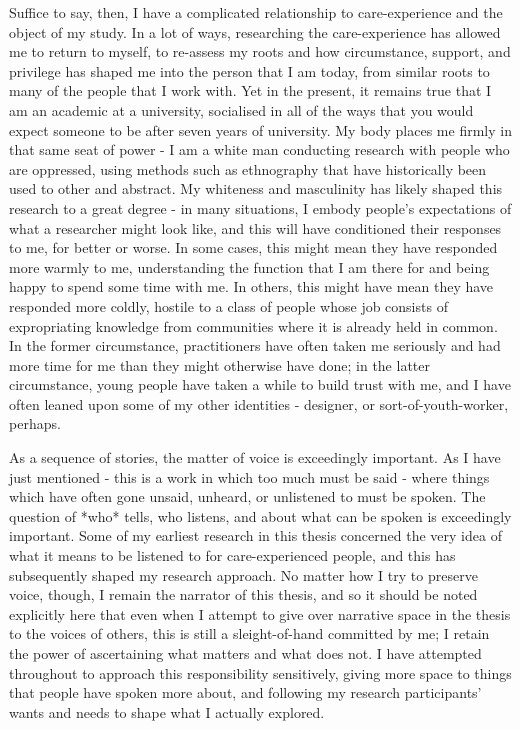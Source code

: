 Suffice to say, then, I have a complicated relationship to care-experience and the object of my study. In a lot of ways, researching the care-experience has allowed me to return to myself, to re-assess my roots and how circumstance, support, and privilege has shaped me into the person that I am today, from similar roots to many of the people that I work with. Yet in the present, it remains true that I am an academic at a university, socialised in all of the ways that you would expect someone to be after seven years of university. My body places me firmly in that same seat of power - I am a white man conducting research with people who are oppressed, using methods such as ethnography that have historically been used to other and abstract. My whiteness and masculinity has likely shaped this research to a great degree - in many situations, I embody people’s expectations of what a researcher might look like, and this will have conditioned their responses to me, for better or worse. In some cases, this might mean they have responded more warmly to me, understanding the function that I am there for and being happy to spend some time with me. In others, this might have mean they have responded more coldly, hostile to a class of people whose job consists of expropriating knowledge from communities where it is already held in common. In the former circumstance, practitioners have often taken me seriously and had more time for me than they might otherwise have done; in the latter circumstance, young people have taken a while to build trust with me, and I have often leaned upon some of my other identities - designer, or sort-of-youth-worker, perhaps. 



As a sequence of stories, the matter of voice is exceedingly important. As I have just mentioned - this is a work in which too much must be said - where things which have often gone unsaid, unheard, or unlistened to must be spoken. The question of *who* tells, who listens, and about what can be spoken is exceedingly important. Some of my earliest research in this thesis concerned the very idea of what it means to be listened to for care-experienced people, and this has subsequently shaped my research approach. No matter how I try to preserve voice, though, I remain the narrator of this thesis, and so it should be noted explicitly here that even when I attempt to give over narrative space in the thesis to the voices of others, this is still a sleight-of-hand committed by me; I retain the power of ascertaining what matters and what does not. I have attempted throughout to approach this responsibility sensitively, giving more space to things that people have spoken more about, and following my research participants’ wants and needs to shape what I actually explored. 

